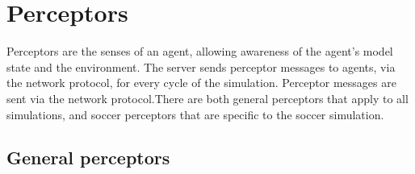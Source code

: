 \section{Perceptors}
Perceptors are the senses of an agent, allowing awareness of the agent's model state and the environment.
The server sends perceptor messages to agents, via the network protocol, for every cycle of the simulation.
Perceptor messages are sent via the network protocol.There are both general perceptors that apply to all simulations, and soccer perceptors that are specific to the soccer simulation.



\subsection{General perceptors}

